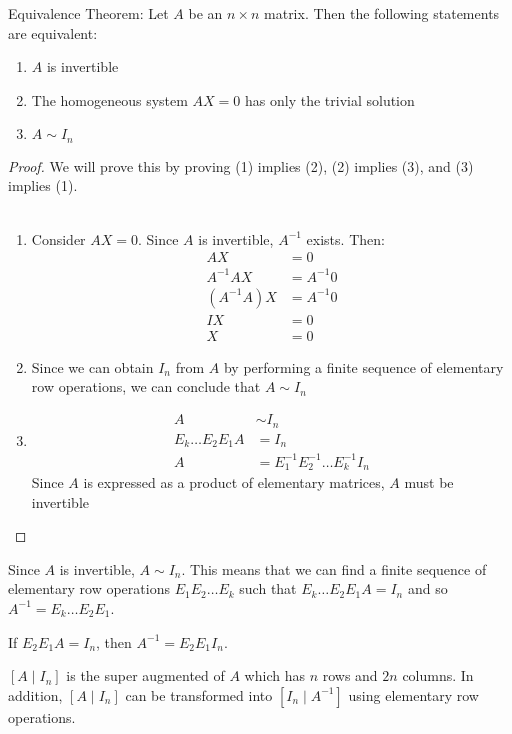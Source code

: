 \documentclass[12pt]{article}
\begin{document}
\begin{theorem} Equivalence Theorem: Let $A$ be an $ n \times n $ matrix. Then the following statements are equivalent: \begin{enumerate} 
\item $A$ is invertible \item The homogeneous system $AX = 0$ has only the trivial solution \item $ A \sim I_n $ \end{enumerate} \end{theorem} 
\begin{proof} We will prove this by proving (1) implies (2), (2) implies (3), and (3) implies (1). \\~\\ \begin{enumerate}
\item Consider $AX = 0$. Since $A$ is invertible, $A^{-1}$ exists. Then: $$ \begin{aligned} AX &= 0 \\ A^{-1}AX &= A^{-1}0 \\ (A^{-1}A)X &= A^{-1}0 \\ IX &= 0 \\ X &= 0 \end{aligned} $$ 
\item Since we can obtain $I_n$ from $A$ by performing a finite sequence of elementary row operations, we can conclude that $ A \sim I_n$ 
\item $$ \begin{aligned} A &\sim I_n \\ E_k \dots E_2E_1A &= I_n \\ A &= E_1^{-1}E_2^{-1}\dots E_k^{-1}I_n \end{aligned} $$ Since $A$ is expressed as a product of elementary matrices, $A$ must be invertible \end{enumerate} \end{proof} 
Since $A$ is invertible, $ A \sim I_n$. This means that we can find a finite sequence of elementary row operations $E_1E_2\dots E_k$ such that $E_k \dots E_2E_1A = I_n$ and so $ A^{-1} = E_k\dots E_2E_1$. 
\begin{example} If $E_2E_1A = I_n$, then $ A^{-1} = E_2E_1I_n$. \end{example}
$[ A \mid I_n] $ is the super augmented of $A$ which has $n$ rows and $2n$ columns. In addition, $[ A \mid I_n] $ can be transformed into $[ I_n \mid A^{-1} ] $ using elementary row operations. 
\end{document}

